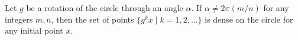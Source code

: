 Let $g$ be a rotation of the circle through an angle $\alpha$. If $\alpha \neq 2\pi(m/n)$ for any integers $m, n$, then the set of points $\{g^k x \mid k = 1, 2, \ldots\}$ is dense on the circle for any initial point $x$.
